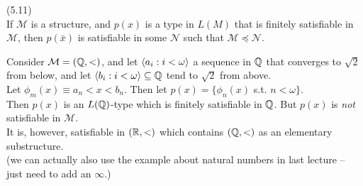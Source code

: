 \documentclass[a4paper]{article}
\begin{document}
\begin{thm} (5.11)\\
    If $\mathcal{M}$ is a structure, and $p(x)$ is a type in $L(M)$ that is finitely satisfiable in $\mathcal{M}$, then $p(\bar{x})$ is satisfiable in some $\mathcal{N}$ such that $\mathcal{M} \preccurlyeq \mathcal{N}$.
\end{thm}

\begin{eg}
    Consider $\mathcal{M} = (\mathbb{Q},<)$, and let $\langle a_i:i < \omega\rangle$ a sequence in $\mathbb{Q}$ that converges to $\sqrt{2}$ from below, and let $\langle b_i:i < \omega\rangle \subseteq \mathbb{Q}$ tend to $\sqrt{2}$ from above.\\
    Let $\phi_m(x) \equiv a_n < x < b_n$. Then let $p(x) = \{\phi_n(x)$ s.t. $n<\omega\}$.\\
    Then $p(x)$ is an $L(\mathbb{Q})$-type which is finitely satisfiable in $\mathbb{Q}$. But $p(x)$ is \emph{not} satisfiable in $\mathcal{M}$.\\
    It is, however, satisfiable in $(\mathbb{R},<)$ which contains $(\mathbb{Q},<)$ as an elementary substructure.\\
    (we can actually also use the example about natural numbers in last lecture -- just need to add an $\infty$.)
\end{eg}
\end{document}
